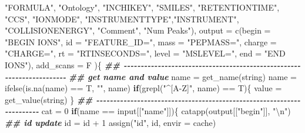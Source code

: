 \documentclass[
]{article}
\newenvironment{Shaded}{\begin{snugshade}}{\end{snugshade}}
\newcommand{\AttributeTok}[1]{\textcolor[rgb]{0.77,0.63,0.00}{#1}}
\newcommand{\ControlFlowTok}[1]{\textcolor[rgb]{0.13,0.29,0.53}{\textbf{#1}}}
\newcommand{\DecValTok}[1]{\textcolor[rgb]{0.00,0.00,0.81}{#1}}
\newcommand{\DocumentationTok}[1]{\textcolor[rgb]{0.56,0.35,0.01}{\textbf{\textit{#1}}}}
\newcommand{\FunctionTok}[1]{\textcolor[rgb]{0.00,0.00,0.00}{#1}}
\newcommand{\NormalTok}[1]{#1}
\newcommand{\OtherTok}[1]{\textcolor[rgb]{0.56,0.35,0.01}{#1}}
\newcommand{\SpecialCharTok}[1]{\textcolor[rgb]{0.00,0.00,0.00}{#1}}
\newcommand{\StringTok}[1]{\textcolor[rgb]{0.31,0.60,0.02}{#1}}
\begin{document}
\begin{Shaded}
\begin{Highlighting}[]
      \StringTok{"FORMULA"}\NormalTok{, }\StringTok{"Ontology"}\NormalTok{, }\StringTok{"INCHIKEY"}\NormalTok{, }\StringTok{"SMILES"}\NormalTok{,}
      \StringTok{"RETENTIONTIME"}\NormalTok{, }\StringTok{"CCS"}\NormalTok{, }\StringTok{"IONMODE"}\NormalTok{,}
      \StringTok{"INSTRUMENTTYPE"}\NormalTok{,}\StringTok{"INSTRUMENT"}\NormalTok{,}
      \StringTok{"COLLISIONENERGY"}\NormalTok{, }\StringTok{"Comment"}\NormalTok{, }\StringTok{"Num Peaks"}\NormalTok{),}
    \AttributeTok{output =} \FunctionTok{c}\NormalTok{(}\AttributeTok{begin =} \StringTok{"BEGIN IONS"}\NormalTok{,}
      \AttributeTok{id =} \StringTok{"FEATURE\_ID="}\NormalTok{,}
      \AttributeTok{mass =} \StringTok{"PEPMASS="}\NormalTok{,}
      \AttributeTok{charge =} \StringTok{"CHARGE="}\NormalTok{,}
      \AttributeTok{rt =} \StringTok{"RTINSECONDS="}\NormalTok{,}
      \AttributeTok{level =} \StringTok{"MSLEVEL="}\NormalTok{,}
      \AttributeTok{end =} \StringTok{"END IONS"}\NormalTok{),}
    \AttributeTok{add\_scans =}\NormalTok{ F}
\NormalTok{    )\{}
    \DocumentationTok{\#\# {-}{-}{-}{-}{-}{-}{-}{-}{-}{-}{-}{-}{-}{-}{-}{-}{-}{-}{-}{-}{-}{-}{-}{-}{-}{-}{-}{-}{-}{-}{-}{-}{-}{-}{-}{-}{-}{-}{-}{-}{-}{-}{-}{-}{-}{-}{-}{-}{-}{-}{-}{-}{-}{-}{-}{-}{-}{-}{-}{-}{-}{-}{-}{-}{-}{-}{-}{-}{-}{-} }
    \DocumentationTok{\#\# get name and value}
\NormalTok{    name }\OtherTok{=} \FunctionTok{get\_name}\NormalTok{(string)}
\NormalTok{    name }\OtherTok{=} \FunctionTok{ifelse}\NormalTok{(}\FunctionTok{is.na}\NormalTok{(name) }\SpecialCharTok{==}\NormalTok{ T, }\StringTok{""}\NormalTok{, name)}
    \ControlFlowTok{if}\NormalTok{(}\FunctionTok{grepl}\NormalTok{(}\StringTok{"\^{}[A{-}Z]"}\NormalTok{, name) }\SpecialCharTok{==}\NormalTok{ T)\{}
\NormalTok{      value }\OtherTok{=} \FunctionTok{get\_value}\NormalTok{(string)}
\NormalTok{    \}}
    \DocumentationTok{\#\# {-}{-}{-}{-}{-}{-}{-}{-}{-}{-}{-}{-}{-}{-}{-}{-}{-}{-}{-}{-}{-}{-}{-}{-}{-}{-}{-}{-}{-}{-}{-}{-}{-}{-}{-}{-}{-}{-}{-}{-}{-}{-}{-}{-}{-}{-}{-}{-}{-}{-}{-}{-}{-}{-}{-}{-}{-}{-}{-}{-}{-}{-}{-}{-}{-}{-}{-}{-}{-}{-} }
\NormalTok{    cat }\OtherTok{=} \DecValTok{0}
    \ControlFlowTok{if}\NormalTok{(name }\SpecialCharTok{==}\NormalTok{ input[[}\StringTok{"name"}\NormalTok{]])\{}
      \FunctionTok{catapp}\NormalTok{(output[[}\StringTok{"begin"}\NormalTok{]], }\StringTok{"}\SpecialCharTok{\textbackslash{}n}\StringTok{"}\NormalTok{)}
      \DocumentationTok{\#\# id update}
\NormalTok{      id }\OtherTok{=}\NormalTok{ id }\SpecialCharTok{+} \DecValTok{1}
      \FunctionTok{assign}\NormalTok{(}\StringTok{"id"}\NormalTok{, id, }\AttributeTok{envir =}\NormalTok{ cache)}

\end{Highlighting}
\end{Shaded}
\end{document}

